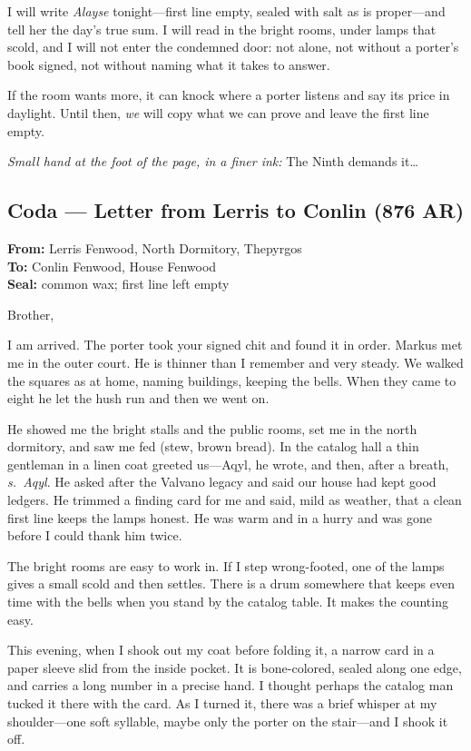 \documentclass[11pt]{article}
\numberwithin{equation}{section} %
\theoremstyle{plain} %
\theoremstyle{definition} %
\theoremstyle{remark} %
\begin{document}
I will write \textit{Alayse} tonight—first line empty, sealed with salt as is proper—and tell her the day’s true sum. I will read in the bright rooms, under lamps that scold, and I will not enter the condemned door: not alone, not without a porter’s book signed, not without naming what it takes to answer.

If the room wants more, it can knock where a porter listens and say its price in daylight. Until then, \textit{we} will copy what we can prove and leave the first line empty.

\medskip
\noindent\textit{Small hand at the foot of the page, in a finer ink:} The Ninth demands it\ldots{}

\subsection*{Coda — Letter from Lerris to Conlin (876 AR)}

\noindent\textbf{From:} Lerris Fenwood, North Dormitory, Thepyrgos \\
\textbf{To:} Conlin Fenwood, House Fenwood \\
\textbf{Seal:} common wax; first line left empty

\medskip
\noindent Brother,

I am arrived. The porter took your signed chit and found it in order. Markus met me in the outer court. He is thinner than I remember and very steady. We walked the squares as at home, naming buildings, keeping the bells. When they came to eight he let the hush run and then we went on.

He showed me the bright stalls and the public rooms, set me in the north dormitory, and saw me fed (stew, brown bread). In the catalog hall a thin gentleman in a linen coat greeted us—Aqyl, he wrote, and then, after a breath, \emph{s.\ Aqyl}. He asked after the Valvano legacy and said our house had kept good ledgers. He trimmed a finding card for me and said, mild as weather, that a clean first line keeps the lamps honest. He was warm and in a hurry and was gone before I could thank him twice.

The bright rooms are easy to work in. If I step wrong-footed, one of the lamps gives a small scold and then settles. There is a drum somewhere that keeps even time with the bells when you stand by the catalog table. It makes the counting easy.

This evening, when I shook out my coat before folding it, a narrow card in a paper sleeve slid from the inside pocket. It is bone-colored, sealed along one edge, and carries a long number in a precise hand. I thought perhaps the catalog man tucked it there with the card. As I turned it, there was a brief whisper at my shoulder—one soft syllable, maybe only the porter on the stair—and I shook it off.
\end{document}
